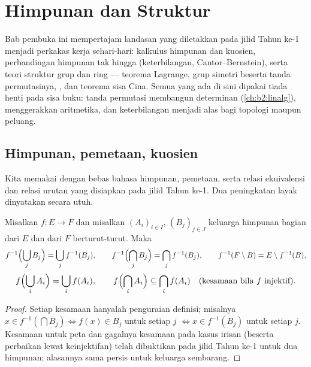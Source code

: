 \chapter{Himpunan dan Struktur}\label{ch:b2:structures}

Bab pembuka ini mempertajam landasan yang diletakkan pada jilid Tahun
ke-1 menjadi perkakas kerja sehari-hari: kalkulus himpunan dan kuosien,
perbandingan himpunan tak hingga (keterbilangan, Cantor--Bernstein),
serta teori struktur grup dan ring --- teorema Lagrange, grup simetri
beserta tanda permutasinya, , dan teorema sisa Cina. Semua yang ada
di sini dipakai tiada henti pada sisa buku: tanda permutasi membangun
determinan (\cref{ch:b2:linalg}),  menggerakkan aritmetika,
dan keterbilangan menjadi alas bagi topologi maupun peluang.

\section{Himpunan, pemetaan, kuosien}

Kita memakai dengan bebas bahasa himpunan, pemetaan, serta relasi
ekuivalensi dan relasi urutan yang disiapkan pada jilid Tahun ke-1. Dua
peningkatan layak dinyatakan secara utuh.

\begin{proposition}\label{prop:b2:structures:images}
Misalkan $f \colon E \to F$ dan misalkan $(A_i)_{i \in I}$, $(B_j)_{j \in J}$
keluarga himpunan bagian dari $E$ dan dari $F$ berturut-turut. Maka
\[
f^{-1}\Bigl(\bigcup_j B_j\Bigr) = \bigcup_j f^{-1}(B_j),
\qquad
f^{-1}\Bigl(\bigcap_j B_j\Bigr) = \bigcap_j f^{-1}(B_j),
\qquad
f^{-1}(F \setminus B) = E \setminus f^{-1}(B),
\]
\[
f\Bigl(\bigcup_i A_i\Bigr) = \bigcup_i f(A_i),
\qquad
f\Bigl(\bigcap_i A_i\Bigr) \subseteq \bigcap_i f(A_i)
\quad (\text{kesamaan bila } f \text{ injektif}).
\]
\end{proposition}

\begin{proof}
Setiap kesamaan hanyalah penguraian definisi; misalnya $x \in
f^{-1}(\bigcap B_j) \iff f(x) \in B_j$ untuk setiap $j$ $\iff x \in
f^{-1}(B_j)$ untuk setiap $j$. Kesamaan untuk peta dan gagalnya
kesamaan pada kasus irisan (beserta perbaikan lewat keinjektifan) telah
dibuktikan pada jilid Tahun ke-1 untuk dua himpunan; alasannya sama
persis untuk keluarga sembarang.
\end{proof}

